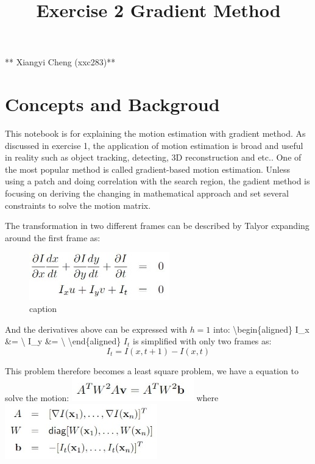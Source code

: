 \documentclass[11pt]{article}
\title{Exercise 2  Gradient Method}
\makeatletter
\def\maxwidth{\ifdim\Gin@nat@width>\linewidth\linewidth
    \else\Gin@nat@width\fi}
\let\Oldincludegraphics\includegraphics
\renewcommand{\includegraphics}[1]{\Oldincludegraphics[width=.8\maxwidth]{#1}}
\makeatother
\begin{document}
    
    
    \maketitle
    
    

    
    ** Xiangyi Cheng (xxc283)**

    \hypertarget{concepts-and-backgroud}{%
\section{Concepts and Backgroud}\label{concepts-and-backgroud}}

    This notebook is for explaining the motion estimation with gradient
method. As discussed in exercise 1, the application of motion estimation
is broad and useful in reality such as object tracking, detecting, 3D
reconstruction and etc.. One of the most popular method is called
gradient-based motion estimation. Unless using a patch and doing
correlation with the search region, the gadient method is focusing on
deriving the changing in mathematical approach and set several
constraints to solve the motion matrix.

The transformation in two different frames can be described by Talyor
expanding around the first frame as:

\begin{figure}
\centering
\includegraphics{eq1_r4.jpg}
\caption{caption}
\end{figure}

And the derivatives above can be expressed with \(h=1\) into:
\textbackslash{}begin\{aligned\} I\_x \&=
 \textbackslash{} I\_y \&=
 \textbackslash{}
\textbackslash{}end\{aligned\} \(I_t\) is simplified with only two
frames as: \[I_t = I(x, t+1) - I(x, t)\]

    This problem therefore becomes a least square problem, we have a
equation to solve the motion: \includegraphics{eq2_r2.jpg} where
\includegraphics{eq3_r4.jpg}
\end{document}
